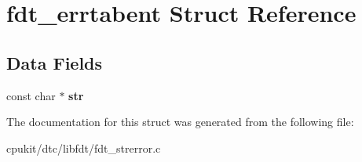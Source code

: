 \hypertarget{structfdt__errtabent}{}\section{fdt\+\_\+errtabent Struct Reference}
\label{structfdt__errtabent}
\subsection*{Data Fields}
\begin{DoxyCompactItemize}
\item 
\mbox{\label{structfdt__errtabent_afb5741d1d343729e8d9025a7cc129315}} 
const char $\ast$ {\bfseries str}
\end{DoxyCompactItemize}


The documentation for this struct was generated from the following file\+:\begin{DoxyCompactItemize}
\item 
cpukit/dtc/libfdt/fdt\+\_\+strerror.\+c\end{DoxyCompactItemize}
